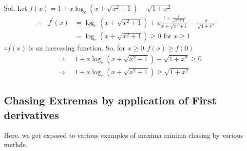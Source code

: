 \begin{enumerate}
\begin{outline}
    Sol. Let $f(x)=1+x \log _e\left(x+\sqrt{x^2+1}\right)-\sqrt{1+x^2}$
$$
\begin{aligned}
\therefore \quad f^{\prime}(x) & =\log _e\left(x+\sqrt{x^2+1}\right)+x \frac{1+\frac{x}{\sqrt{x^2+1}}}{x+\sqrt{x^2+1}}-\frac{x}{\sqrt{1+x^2}} \\
& =\log _e\left(x+\sqrt{x^2+1}\right) \geq 0 \text { for } x \geq 1
\end{aligned}
$$
$\therefore f(x)$ is an increasing function.
So, for $x \geq 0, f(x) \geq f(0)$
$$
\begin{aligned}
& \Rightarrow \quad 1+x \log _e\left(x+\sqrt{x^2+1}\right)-\sqrt{1+x^2} \geq 0 \\
& \Rightarrow \quad 1+x \log _e\left(x+\sqrt{x^2+1}\right) \geq \sqrt{1+x^2}
\end{aligned}
$$
\end{outline}

\end{enumerate}

\subsection{Chasing Extremas by application of First derivatives}

Here, we get exposed to various examples of maxima minima chasing by various methds.

